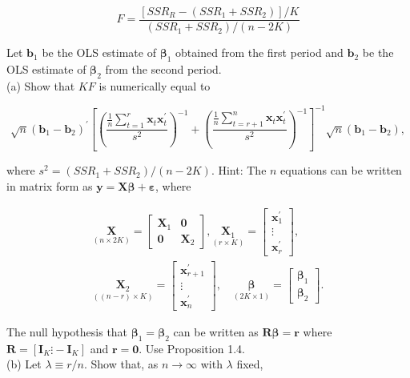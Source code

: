 \documentclass[10pt]{article}
\begin{document}
$$
F=\frac{\left[S S R_{R}-\left(S S R_{1}+S S R_{2}\right)\right] / K}{\left(S S R_{1}+S S R_{2}\right) /(n-2 K)}
$$

Let $\mathbf{b}_{1}$ be the OLS estimate of $\boldsymbol{\beta}_{1}$ obtained from the first period and $\mathbf{b}_{2}$ be the OLS estimate of $\boldsymbol{\beta}_{2}$ from the second period.\\
(a) Show that $K F$ is numerically equal to

$$
\sqrt{n}\left(\mathbf{b}_{1}-\mathbf{b}_{2}\right)^{\prime}\left[\left(\frac{\frac{1}{n} \sum_{t=1}^{r} \mathbf{x}_{t} \mathbf{x}_{t}^{\prime}}{s^{2}}\right)^{-1}+\left(\frac{\frac{1}{n} \sum_{t=r+1}^{n} \mathbf{x}_{t} \mathbf{x}_{t}^{\prime}}{s^{2}}\right)^{-1}\right]^{-1} \sqrt{n}\left(\mathbf{b}_{1}-\mathbf{b}_{2}\right),
$$

where $s^{2}=\left(S S R_{1}+S S R_{2}\right) /(n-2 K)$. Hint: The $n$ equations can be written in matrix form as $\mathbf{y}=\mathbf{X} \boldsymbol{\beta}+\boldsymbol{\varepsilon}$, where

$$
\begin{gathered}
\underset{(n \times 2 K)}{\mathbf{X}}=\left[\begin{array}{cc}
\mathbf{X}_{1} & \mathbf{0} \\
\mathbf{0} & \mathbf{X}_{2}
\end{array}\right], \underset{(r \times K)}{\mathbf{X}_{1}}=\left[\begin{array}{c}
\mathbf{x}_{1}^{\prime} \\
\vdots \\
\mathbf{x}_{r}^{\prime}
\end{array}\right], \\
\underset{((n-r) \times K)}{\mathbf{X}_{2}}=\left[\begin{array}{c}
\mathbf{x}_{r+1}^{\prime} \\
\vdots \\
\mathbf{x}_{n}^{\prime}
\end{array}\right], \quad \underset{(2 K \times 1)}{\boldsymbol{\beta}}=\left[\begin{array}{c}
\boldsymbol{\beta}_{1} \\
\boldsymbol{\beta}_{2}
\end{array}\right] .
\end{gathered}
$$

The null hypothesis that $\boldsymbol{\beta}_{1}=\boldsymbol{\beta}_{2}$ can be written as $\mathbf{R} \boldsymbol{\beta}=\mathbf{r}$ where $\mathbf{R}= \left[\mathbf{I}_{K} \vdots-\mathbf{I}_{K}\right]$ and $\mathbf{r}=\mathbf{0}$. Use Proposition 1.4.\\
(b) Let $\lambda \equiv r / n$. Show that, as $n \rightarrow \infty$ with $\lambda$ fixed,
\end{document}
